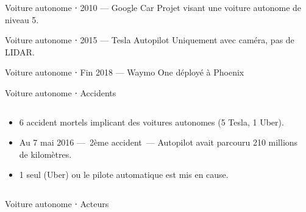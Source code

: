 \begin{frame}{Voiture autonome ⋅ 2010 --- Google Car}
  Projet visant une voiture autonome de niveau 5.

\end{frame}

\begin{frame}{Voiture autonome ⋅ 2015 --- Tesla Autopilot}
  Uniquement avec caméra, pas de LIDAR.

\end{frame}

\begin{frame}{Voiture autonome ⋅ Fin 2018 --- Waymo One déployé à Phoenix}
\end{frame}

\begin{frame}{Voiture autonome ⋅ Accidents}
  \begin{columns}
    \begin{column}{0.6\textwidth}
      \begin{itemize}
        \item 6 accident mortels implicant des voitures autonomes (5 Tesla, 1 Uber).
        \item Au 7 mai 2016 ---~2ème accident~--- Autopilot avait parcouru 210 millions de kilomètres.
        \item 1 seul (Uber) ou le pilote automatique est mis en cause.
      \end{itemize}
    \end{column}
    \begin{column}{0.4\textwidth}
    \end{column}
  \end{columns}
\end{frame}

\begin{frame}{Voiture autonome ⋅ Acteurs}
\end{frame}

